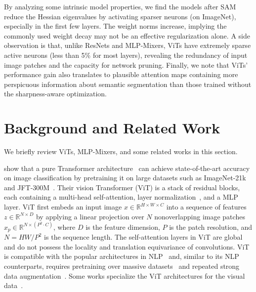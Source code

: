 \documentclass{article}
\begin{document}
By analyzing some intrinsic model properties, we find the models after SAM reduce the Hessian eigenvalues by activating sparser neurons (on ImageNet), especially in the first few layers. The weight norms increase, implying the commonly used weight decay may not be an effective regularization alone. A side observation is that, unlike ResNets and MLP-Mixers, ViTs have extremely sparse active neurons (less than 5\% for most layers), revealing the redundancy of input image patches and the capacity for network pruning. Finally, we note that ViTs' performance gain also translates to plausible attention maps containing more perspicuous information about semantic segmentation than those trained without the sharpness-aware optimization.


\section{Background and Related Work}
We briefly review ViTs, MLP-Mixers, and some related works in this section.

\citet{dosovitskiy2021an} show that a pure Transformer architecture~\cite{vaswani2017attention} can achieve state-of-the-art accuracy on image classification by pretraining it on large datasets such as ImageNet-21k~\cite{deng2009imagenet} and JFT-300M~\cite{sun2017revisiting}.
Their vision Transformer (ViT) is a  stack of residual blocks, each containing a multi-head self-attention, layer normalization~\cite{layer-norm}, and a MLP layer. 
ViT first embeds an input image $x\in \mathbb{R}^{H\times W\times C}$ into a sequence of features $z\in \mathbb{R}^{N\times D}$ by applying a linear projection over $N$ nonoverlapping image patches $x_p \in \mathbb{R}^{N\times(P^2\cdot C)}$, where $D$ is the feature dimension, $P$ is the patch resolution, and $N=HW/P^2$ is the sequence length.
The self-attention layers in ViT are global and do not possess the locality and translation equivariance of convolutions. ViT is compatible with the popular architectures in NLP~\cite{devlin2018bert,gpt} and, similar to its NLP counterparts, requires pretraining over massive datasets~\cite{dosovitskiy2021an,akbari2021vatt,arnab2021vivit} and repeated strong data augmentation~\cite{touvron2021training}. Some works specialize the ViT architectures for the visual data~\cite{liu2021swin,yuan2021tokenstotoken,fan2021multiscale,bertasius2021space}.
\end{document}
